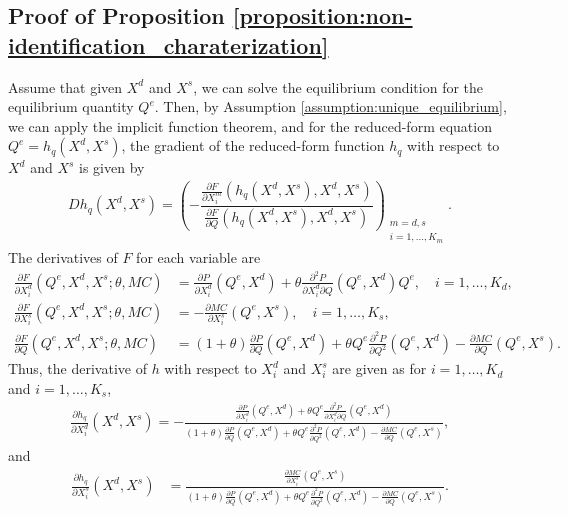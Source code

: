 \documentclass[11pt, a4paper]{article}
\theoremstyle{remark}
\begin{document}
\subsection{Proof of Proposition \ref{proposition:non-identification_charaterization}}
Assume that given $X^{d}$ and $X^{s}$, we can solve the equilibrium condition for the equilibrium quantity $Q^e$.
Then, by Assumption \ref{assumption:unique_equilibrium}, we can apply the implicit function theorem, and for the reduced-form equation $Q^e = h_q(X^{d}, X^{s})$, the gradient of the reduced-form function $h_q$ with respect to $X^{d}$ and $X^{s}$ is given by
\begin{align}
    Dh_q(X^{d}, X^{s}) =  \left( -\dfrac{\frac{\partial F}{\partial X^{m}_{i}}(h_q(X^{d}, X^{s}), X^{d}, X^{s})}{\frac{\partial F}{\partial Q}(h_q(X^{d}, X^{s}), X^{d}, X^{s})} \right)_{\substack{m = d, s\\ i = 1, \ldots, K_m}}. \label{eq:foc_derivative_demand_supply}
\end{align}
The derivatives of $F$ for each variable are
\begin{align}
    \frac{\partial F}{\partial X^{d}_i}(Q^e, X^{d}, X^{s}; \theta, MC) & =  \frac{\partial P}{\partial X^{d}_{i}}(Q^e, X^{d}) + \theta\frac{\partial^2 P}{\partial X^{d}_{i}\partial Q}(Q^e, X^{d})Q^e, \quad i = 1, \ldots, K_d,\\
    \frac{\partial F}{\partial X^{s}_i}(Q^e, X^{d}, X^{s}; \theta, MC) & =  -\frac{\partial MC}{\partial X^{s}_{i}}(Q^e, X^{s}), \quad i = 1, \ldots, K_s, \\
    \frac{\partial F}{\partial Q}(Q^e, X^{d}, X^{s}; \theta, MC) & = (1+\theta)\frac{\partial P}{\partial Q}(Q^e, X^{d}) + \theta Q^e\frac{\partial^2 P}{\partial Q^2}(Q^e, X^{d}) - \frac{\partial MC}{\partial Q}(Q^e, X^{s}).
\end{align}
Thus, the derivative of $h$ with respect to $X^{d}_i$ and $X^{s}_i$ are given as for $i = 1, \ldots, K_d$ and $i = 1, \ldots, K_s$,
\begin{align}
    \frac{\partial h_q}{\partial X^{d}_{i}}(X^{d}, X^{s}) = -\frac{\frac{\partial P}{\partial X^{d}_{i}}(Q^e, X^{d}) + \theta Q^e \frac{\partial^2 P}{\partial X^{d}_{i}\partial Q}(Q^e, X^{d}) }{(1+\theta)\frac{\partial P}{\partial Q}(Q^e, X^{d}) + \theta  Q^e\frac{\partial^2 P}{\partial Q^2}(Q^e, X^{d}) - \frac{\partial MC}{\partial Q}(Q^e, X^{s})}, \label{eq:foc_derivative_demand}
\end{align}
and
\begin{align}
    \frac{\partial h_q}{\partial X^{s}_{i}}(X^{d}, X^{s}) & = \frac{\frac{\partial MC}{\partial X^{s}_{i}}(Q^e, X^{s})}{(1+\theta)\frac{\partial P}{\partial Q}(Q^e, X^{d}) + \theta  Q^e\frac{\partial^2 P}{\partial Q^2}(Q^e, X^{d}) - \frac{\partial MC}{\partial Q}(Q^e, X^{s})}. \label{eq:foc_derivative_supply}
\end{align}
\end{document}
